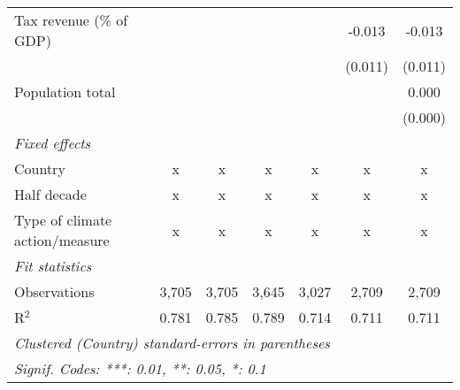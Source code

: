 \begin{tabular}{lcccccc}
   Tax revenue (\% of GDP)              &               &                &               &              & -0.013       & -0.013\\   
                                        &               &                &               &              & (0.011)      & (0.011)\\   
   Population total                     &               &                &               &              &              & 0.000\\   
                                        &               &                &               &              &              & (0.000)\\   
   \emph{Fixed effects}\\
   Country                              & x             & x              & x             & x            & x            & x\\  
   Half decade                          & x             & x              & x             & x            & x            & x\\  
   Type of climate action/measure       & x             & x              & x             & x            & x            & x\\  
   \midrule \emph{Fit statistics}\\
   Observations                         & 3,705         & 3,705          & 3,645         & 3,027        & 2,709        & 2,709\\  
   R$^2$                                & 0.781         & 0.785          & 0.789         & 0.714        & 0.711        & 0.711\\  
   \midrule
   \multicolumn{7}{l}{\emph{Clustered (Country) standard-errors in parentheses}}\\
   \multicolumn{7}{l}{\emph{Signif. Codes: ***: 0.01, **: 0.05, *: 0.1}}\\
\end{tabular}
\par\endgroup


